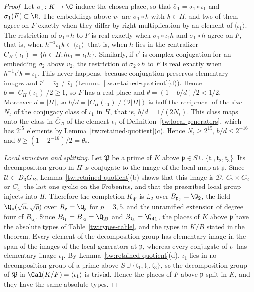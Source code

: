 \begin{proof}
Let $\sigma_1\colon K\to\C$
induce the chosen place, so that $\bar\sigma_1=\sigma_1\circ\iota_1$ and
$\sigma_1(F)\subset\R$. The embeddings above $v_1$ are $\sigma_1\circ h$ with
$h\in H$, and two of them agree on $F$ exactly when they differ by right
multiplication by an element of $\langle\iota_1\rangle$. The restriction of
$\sigma_1\circ h$ to $F$ is real exactly when $\sigma_1\circ\iota_1h$ and
$\sigma_1\circ h$ agree on $F$, that is, when
$h^{-1}\iota_1h\in\langle\iota_1\rangle$, that is, when $h$ lies in the
centralizer $C_H(\iota_1)=\{h\in H:h\iota_1=\iota_1h\}$. Similarly, if $\iota'$ is complex conjugation for an
embedding $\sigma_2$ above $v_2$, the restriction of $\sigma_2\circ h$ to $F$
is real exactly when $h^{-1}\iota'h=\iota_1$. This never happens, because
conjugation preserves elementary images and $\bar\iota'=\bar\iota_2\ne\bar\iota_1$
(Lemma~\ref{tw:retained-quotient}(d)). Hence $b=|C_H(\iota_1)|/2\ge1$, so $F$
has a real place and $\theta=(1-b/d)/2<1/2$. Moreover $d=|H|$, so
$b/d=|C_H(\iota_1)|/(2|H|)$ is half the reciprocal of the size $N_\iota$ of
the conjugacy class of $\iota_1$ in $H$, that is, $b/d=1/(2N_\iota)$. This
class maps onto the class in $\overline G_B$ of the element $\iota_1$ of
Definition~\ref{tw:local-generators}, which has $2^{15}$
elements by Lemma~\ref{tw:retained-quotient}(c). Hence $N_\iota\ge2^{15}$,
$b/d\le2^{-16}$ and $\theta\ge(1-2^{-16})/2=\theta_*$.

\emph{Local structure and splitting.} Let $\mathfrak P$ be a prime of $K$
above $\mathfrak p\in S\cup\{\mathfrak t_1,\mathfrak t_2,\mathfrak t_3\}$. Its
decomposition group in $H$ is conjugate to the image of the local map at
$\mathfrak p$. Since $\mathcal U\subset D_3G_B$, Lemma~\ref{tw:retained-quotient}(b)
shows that this image is $\mathcal D$, $C_2\times C_2$ or $C_4$, the last one cyclic on
the Frobenius, and that the prescribed local group injects into $H$.
Therefore the completion $K_{\mathfrak P}$ is $L_2$ over
$B_{\mathfrak p_j}=\Q_2$, the field $\Q_p(\sqrt u,\sqrt p)$ over
$B_{\mathfrak p}=\Q_p$ for $p=3,5$, and the unramified extension of degree
four of $B_{\mathfrak t_k}$. Since $B_{\mathfrak t_1}=B_{\mathfrak t_2}=\Q_{29}$
and $B_{\mathfrak t_3}=\Q_{41}$, the places of $K$ above $\mathfrak p$ have the
absolute types of Table~\ref{tw:types-table}, and the types in $K/B$ stated in
the theorem. Every element of
the decomposition group has elementary image in the span of the images of the
local generators at $\mathfrak p$, whereas every conjugate of $\iota_1$ has
elementary image $\bar\iota_1$. By Lemma~\ref{tw:retained-quotient}(d),
$\iota_1$ lies in no decomposition group of a prime above
$S\cup\{\mathfrak t_1,\mathfrak t_2,\mathfrak t_3\}$, so the decomposition
group of $\mathfrak P$ in $\Gal(K/F)=\langle\iota_1\rangle$ is trivial. Hence
the places of $F$ above $\mathfrak p$ split in $K$, and they have the same
absolute types.


\end{proof}

